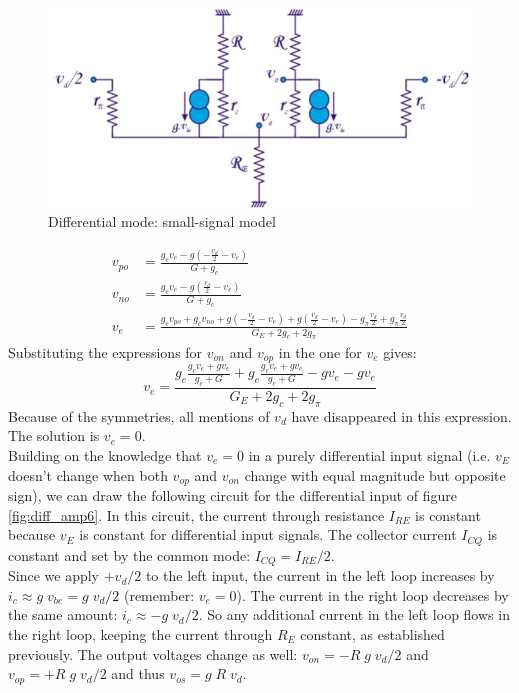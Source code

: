 \begin{figure}[h!]
	\centering
	\includegraphics[width=12cm]{figures/ch02/diff_amp5.jpg}
	\caption{Differential mode: small-signal model}
	\label{fig:diff_amp5}
\end{figure}
\begin{align*}
	v_{po} &= \frac{g_c v_e - g(-\frac{v_d}{2} - v_e)}{G + g_c} \\
	v_{no} &= \frac{g_c v_e - g(\frac{v_d}{2} - v_e)}{G + g_c} \\
	v_e &= \frac{g_c v_{po} + g_c v_{no} + g(-\frac{v_d}{2} - v_e) + g(\frac{v_d}{2} - v_e) - g_{\pi} \frac{v_d}{2} + g_{\pi} \frac{v_d}{2}}{G_E + 2g_c + 2g_{\pi}}
\end{align*}
Substituting the expressions for $v_{on}$ and $v_{op}$ in the one for $v_e$ gives:
$$
v_e = \frac{g_c \frac{g_c v_e + g v_e}{g_c + G} + g_c \frac{g_c v_e + g v_e}{g_c + G} -g v_e -g v_e}{G_E + 2 g_c + 2 g_{\pi}}
$$
Because of the symmetries, all mentions of $v_d$ have disappeared in this expression. The solution is $v_e = 0$.\\
Building on the knowledge that $v_e = 0$ in a purely differential input signal (i.e. $v_E$ doesn't change when both $v_{op}$ and $v_{on}$ change with equal magnitude but opposite sign), we can draw the following circuit for the differential input of figure \ref{fig:diff_amp6}. In this circuit, the current through resistance $I_{RE}$ is constant because $v_E$ is constant for differential input signals. The collector current $I_{CQ}$ is constant and set by the common mode: $I_{CQ} = I_{RE}/2$. \\
Since we apply $+v_d/2$ to the left input, the current in the left loop increases by $i_c \approx g \; v_{be} = g \; v_d/2$ (remember: $v_e=0$). The current in the right loop decreases by the same amount:  $i_c \approx -g \; v_d/2$. So any additional current in the left loop flows in the right loop, keeping the current through $R_E$ constant, as established previously. The output voltages change as well: $v_{on} = -R \; g \; v_d/2$ and $v_{op} = +R \; g \; v_d/2$ and thus $v_{os} = g  \; R  \; v_d$.

